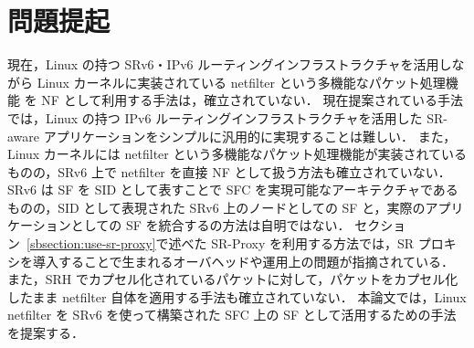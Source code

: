 
\section{問題提起}
\label{section:prob}
現在，Linux の持つ SRv6・IPv6 ルーティングインフラストラクチャを活用しながら Linux カーネルに実装されている netfilter という多機能なパケット処理機能 を NF として利用する手法は，確立されていない．
現在提案されている手法では，Linux の持つ IPv6 ルーティングインフラストラクチャを活用した SR-aware アプリケーションをシンプルに汎用的に実現することは難しい．
また，Linux カーネルには netfilter という多機能なパケット処理機能が実装されているものの，SRv6 上で netfilter を直接 NF として扱う方法も確立されていない．
SRv6 は SF を SID として表すことで SFC を実現可能なアーキテクチャであるものの，SID として表現された SRv6 上のノードとしての SF と，実際のアプリケーションとしての SF を統合するの方法は自明ではない．
セクション~\ref*{sbsection:use-sr-proxy}で述べた SR-Proxy を利用する方法では，SR プロキシを導入することで生まれるオーバヘッドや運用上の問題が指摘されている．
また，SRH でカプセル化されているパケットに対して，パケットをカプセル化したまま netfilter 自体を適用する手法も確立されていない．
本論文では，Linux netfilter を SRv6 を使って構築された SFC 上の SF として活用するための手法を提案する．
